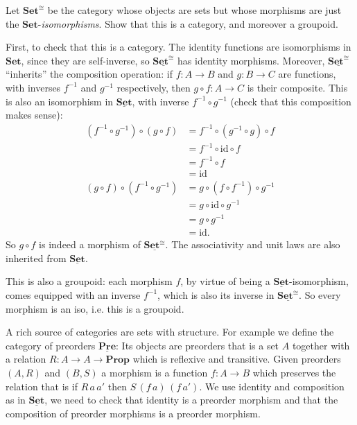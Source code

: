 \documentclass{article}
\newcommand{\Prop}{\mathbf{Prop}}
\newcommand{\Set}{\mathbf{Set}}
\newcommand{\cat}[1]{\underline{\mathbf{#1}}}
\newcommand{\id}{\mathrm{id}}
\newcommand{\inv}{^{-1}}
\begin{document}
\begin{Exercise}
  Let $\Set^{\cong}$ be the category whose objects are sets but whose morphisms are just the $\Set$-\emph{isomorphisms}. Show that this is a category, and moreover a groupoid. 
\end{Exercise}
\begin{Answer}
  First, to check that this is a category. The identity functions are isomorphisms in $\Set$, since they are self-inverse, so $\cat{\Set^{\cong}}$ has identity morphisms. Moreover, $\cat{\Set^{\cong}}$ ``inherits'' the composition operation: if $f\colon A\to B$ and $g\colon B\to C$ are functions, with inverses $f\inv$ and $g\inv$ respectively, then $g\circ f : A \to C$ is their composite. This is also an isomorphism in $\cat{\Set}$, with inverse $f\inv\circ g\inv$ (check that this composition makes sense):
  \begin{align*}
    (f\inv\circ g\inv)\circ (g\circ f) 
      &= f\inv \circ (g\inv\circ g)\circ f\\ 
      &= f\inv \circ \id\circ f \\
      &= f\inv \circ f \\
      &= \id\\
    (g\circ f)\circ (f\inv\circ g\inv)
      &= g\circ (f\circ f\inv)\circ g\inv\\
      &= g\circ \id \circ g\inv\\
      &= g\circ g\inv\\
      &= \id.
  \end{align*}
  So $g\circ f$ is indeed a morphism of $\cat{Set^{\cong}}$. The associativity and unit laws are also inherited from $\cat{\Set}$.

  This is also a groupoid: each morphism $f$, by virtue of being a $\cat{Set}$-isomorphism, comes equipped with an inverse $f\inv$, which is also its inverse in $\cat{Set^{\cong}}$. So every morphism is an iso, i.e. this is a groupoid.
\end{Answer}

A rich source of categories are sets with structure. For example we define the category of preorders $\cat{Pre}$: Its objects are preorders that is a set $A$ together with a relation $R : A \to A \to \Prop$ which is reflexive and transitive. Given preorders $(A,R)$ and $(B,S)$ a morphism is a function $f : A \to B$ which preserves the relation that is if $R\,a\,a'$ then $S\,(f\,a)\,(f\,a')$. We use identity and composition as in $\cat{Set}$, we need to check that identity is a preorder morphism and that the composition of preorder morphisms is a preorder morphism.
\end{document}
